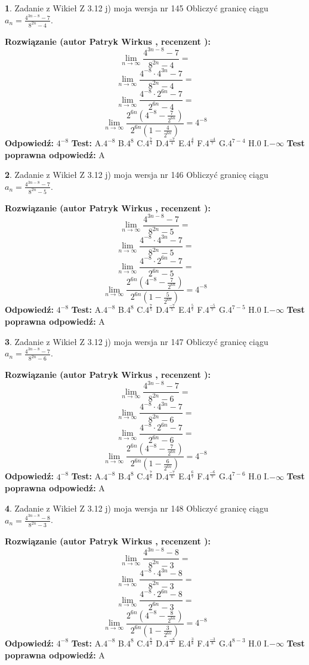 \documentclass[12pt, a4paper]{article}
\theoremstyle{definition} %
\newtheorem{zad}{}
\newcommand{\zadStart}[1]{\begin{zad}#1\newline}
\newcommand{\zadStop}{\end{zad}}
\newcommand{\rozwStart}[2]{\noindent \textbf{Rozwiązanie (autor #1 , recenzent #2): }\newline}
\newcommand{\rozwStop}{\newline}
\newcommand{\odpStart}{\noindent \textbf{Odpowiedź:}\newline}
\newcommand{\odpStop}{\newline}
\newcommand{\testStart}{\noindent \textbf{Test:}\newline}
\newcommand{\testStop}{\newline}
\newcommand{\kluczStart}{\noindent \textbf{Test poprawna odpowiedź:}\newline}
\newcommand{\kluczStop}{\newline}
\begin{document}
\zadStart{Zadanie z Wikieł Z 3.12 j) moja wersja nr 145}
Obliczyć granicę ciągu $a_{n}=\frac{4^{3n-8}-7}{8^{2n}-4}$.
\zadStop
\rozwStart{Patryk Wirkus}{}
$$\lim\limits_{n\to\infty}\frac{4^{3n-8}-7}{8^{2n}-4}=$$
$$\lim\limits_{n\to\infty}\frac{4^{-8} \cdot 4^{3n}-7}{8^{2n}-4}=$$
$$\lim\limits_{n\to\infty}\frac{4^{-8} \cdot 2^{6n}-7}{2^{6n}-4}=$$
$$\lim\limits_{n\to\infty}\frac{2^{6n}(4^{-8} - \frac{7}{2^{6n}})}{2^{6n}(1-\frac{4}{2^{6n}})}= 4^{-8}$$
\rozwStop
\odpStart
$4^{-8}$
\odpStop
\testStart
A.$4^{-8}$
B.$4^{8}$
C.$4^{\frac{7}{4}}$
D.$4^{\frac{-7}{4}}$
E.$4^{\frac{4}{7}}$
F.$4^{\frac{-4}{7}}$
G.$4^{7-4}$
H.$0$
I.$-\infty$
\testStop
\kluczStart
A
\kluczStop



\zadStart{Zadanie z Wikieł Z 3.12 j) moja wersja nr 146}
Obliczyć granicę ciągu $a_{n}=\frac{4^{3n-8}-7}{8^{2n}-5}$.
\zadStop
\rozwStart{Patryk Wirkus}{}
$$\lim\limits_{n\to\infty}\frac{4^{3n-8}-7}{8^{2n}-5}=$$
$$\lim\limits_{n\to\infty}\frac{4^{-8} \cdot 4^{3n}-7}{8^{2n}-5}=$$
$$\lim\limits_{n\to\infty}\frac{4^{-8} \cdot 2^{6n}-7}{2^{6n}-5}=$$
$$\lim\limits_{n\to\infty}\frac{2^{6n}(4^{-8} - \frac{7}{2^{6n}})}{2^{6n}(1-\frac{5}{2^{6n}})}= 4^{-8}$$
\rozwStop
\odpStart
$4^{-8}$
\odpStop
\testStart
A.$4^{-8}$
B.$4^{8}$
C.$4^{\frac{7}{5}}$
D.$4^{\frac{-7}{5}}$
E.$4^{\frac{5}{7}}$
F.$4^{\frac{-5}{7}}$
G.$4^{7-5}$
H.$0$
I.$-\infty$
\testStop
\kluczStart
A
\kluczStop



\zadStart{Zadanie z Wikieł Z 3.12 j) moja wersja nr 147}
Obliczyć granicę ciągu $a_{n}=\frac{4^{3n-8}-7}{8^{2n}-6}$.
\zadStop
\rozwStart{Patryk Wirkus}{}
$$\lim\limits_{n\to\infty}\frac{4^{3n-8}-7}{8^{2n}-6}=$$
$$\lim\limits_{n\to\infty}\frac{4^{-8} \cdot 4^{3n}-7}{8^{2n}-6}=$$
$$\lim\limits_{n\to\infty}\frac{4^{-8} \cdot 2^{6n}-7}{2^{6n}-6}=$$
$$\lim\limits_{n\to\infty}\frac{2^{6n}(4^{-8} - \frac{7}{2^{6n}})}{2^{6n}(1-\frac{6}{2^{6n}})}= 4^{-8}$$
\rozwStop
\odpStart
$4^{-8}$
\odpStop
\testStart
A.$4^{-8}$
B.$4^{8}$
C.$4^{\frac{7}{6}}$
D.$4^{\frac{-7}{6}}$
E.$4^{\frac{6}{7}}$
F.$4^{\frac{-6}{7}}$
G.$4^{7-6}$
H.$0$
I.$-\infty$
\testStop
\kluczStart
A
\kluczStop



\zadStart{Zadanie z Wikieł Z 3.12 j) moja wersja nr 148}
Obliczyć granicę ciągu $a_{n}=\frac{4^{3n-8}-8}{8^{2n}-3}$.
\zadStop
\rozwStart{Patryk Wirkus}{}
$$\lim\limits_{n\to\infty}\frac{4^{3n-8}-8}{8^{2n}-3}=$$
$$\lim\limits_{n\to\infty}\frac{4^{-8} \cdot 4^{3n}-8}{8^{2n}-3}=$$
$$\lim\limits_{n\to\infty}\frac{4^{-8} \cdot 2^{6n}-8}{2^{6n}-3}=$$
$$\lim\limits_{n\to\infty}\frac{2^{6n}(4^{-8} - \frac{8}{2^{6n}})}{2^{6n}(1-\frac{3}{2^{6n}})}= 4^{-8}$$
\rozwStop
\odpStart
$4^{-8}$
\odpStop
\testStart
A.$4^{-8}$
B.$4^{8}$
C.$4^{\frac{8}{3}}$
D.$4^{\frac{-8}{3}}$
E.$4^{\frac{3}{8}}$
F.$4^{\frac{-3}{8}}$
G.$4^{8-3}$
H.$0$
I.$-\infty$
\testStop
\kluczStart
A
\kluczStop
\end{document}
